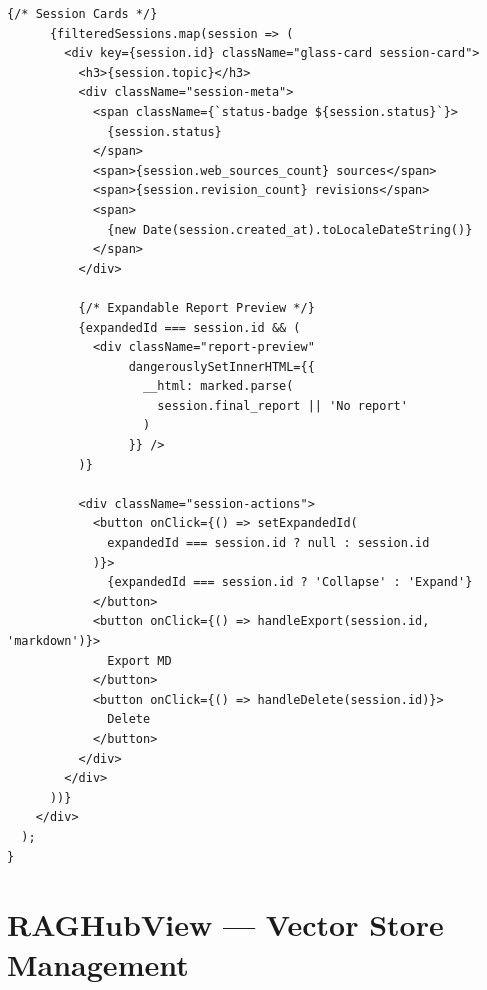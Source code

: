 \documentclass[11pt,a4paper,twoside]{report}
\begin{document}
\begin{lstlisting}[style=jsstyle,caption={LibraryView.jsx --- Search and Filter Logic}]
      {/* Session Cards */}
      {filteredSessions.map(session => (
        <div key={session.id} className="glass-card session-card">
          <h3>{session.topic}</h3>
          <div className="session-meta">
            <span className={`status-badge ${session.status}`}>
              {session.status}
            </span>
            <span>{session.web_sources_count} sources</span>
            <span>{session.revision_count} revisions</span>
            <span>
              {new Date(session.created_at).toLocaleDateString()}
            </span>
          </div>

          {/* Expandable Report Preview */}
          {expandedId === session.id && (
            <div className="report-preview"
                 dangerouslySetInnerHTML={{
                   __html: marked.parse(
                     session.final_report || 'No report'
                   )
                 }} />
          )}

          <div className="session-actions">
            <button onClick={() => setExpandedId(
              expandedId === session.id ? null : session.id
            )}>
              {expandedId === session.id ? 'Collapse' : 'Expand'}
            </button>
            <button onClick={() => handleExport(session.id, 'markdown')}>
              Export MD
            </button>
            <button onClick={() => handleDelete(session.id)}>
              Delete
            </button>
          </div>
        </div>
      ))}
    </div>
  );
}
\end{lstlisting}

\section{RAGHubView --- Vector Store Management}
\end{document}
